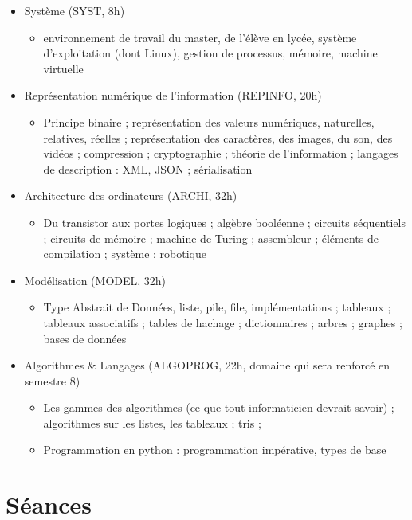 \documentclass[french]{article}
\begin{document}
\begin{itemize}
\item Système (SYST, 8h)
\begin{itemize}
\item environnement de travail du master, de l'élève en lycée, système d'exploitation (dont Linux), gestion de processus, mémoire, machine virtuelle
\end{itemize}

\item Représentation numérique de l'information (REPINFO, 20h)
\begin{itemize}
\item Principe binaire ; représentation des valeurs numériques, naturelles, relatives, réelles ; représentation des caractères, des images, du son, des vidéos ; compression ; cryptographie ; théorie de l'information ; langages de description : XML, JSON ; sérialisation 
\end{itemize}
\item Architecture des ordinateurs (ARCHI, 32h) 
\begin{itemize}
\item Du transistor aux portes logiques ; algèbre booléenne ; circuits séquentiels ; circuits de mémoire ; machine de Turing ; assembleur ; éléments de compilation ; système ; robotique 
\end{itemize}
\item Modélisation (MODEL, 32h) 
\begin{itemize}
\item Type Abstrait de Données, liste, pile, file, implémentations ; tableaux ; tableaux associatifs ; tables de hachage ; dictionnaires ; arbres ; graphes ; bases de données \end{itemize}

\item Algorithmes \& Langages (ALGOPROG, 22h, domaine qui sera renforcé en semestre 8) 
\begin{itemize}
\item Les gammes des algorithmes (ce que tout informaticien devrait savoir) ; algorithmes sur les listes, les tableaux ; tris ;  
\item Programmation en python : programmation impérative, types de base
\end{itemize}

\end{itemize}

\section{Séances}
\end{document}
